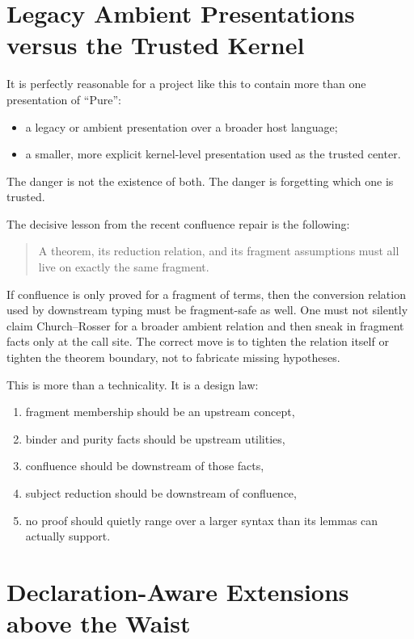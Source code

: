 \documentclass[11pt]{article}
\begin{document}
\section{Legacy Ambient Presentations versus the Trusted Kernel}

It is perfectly reasonable for a project like this to contain more than one
presentation of ``Pure'':
\begin{itemize}[leftmargin=2em]
  \item a legacy or ambient presentation over a broader host language;
  \item a smaller, more explicit kernel-level presentation used as the trusted
  center.
\end{itemize}

The danger is not the existence of both. The danger is forgetting which one is
trusted.

The decisive lesson from the recent confluence repair is the following:

\begin{quote}
A theorem, its reduction relation, and its fragment assumptions must all live on
exactly the same fragment.
\end{quote}

If confluence is only proved for a fragment of terms, then the conversion
relation used by downstream typing must be fragment-safe as well. One must not
silently claim Church--Rosser for a broader ambient relation and then sneak in
fragment facts only at the call site. The correct move is to tighten the
relation itself or tighten the theorem boundary, not to fabricate missing
hypotheses.

This is more than a technicality. It is a design law:
\begin{enumerate}[leftmargin=2em]
  \item fragment membership should be an upstream concept,
  \item binder and purity facts should be upstream utilities,
  \item confluence should be downstream of those facts,
  \item subject reduction should be downstream of confluence,
  \item no proof should quietly range over a larger syntax than its lemmas can
  actually support.
\end{enumerate}

\section{Declaration-Aware Extensions above the Waist}
\end{document}
